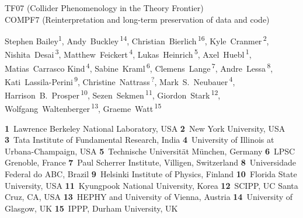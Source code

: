 \documentclass[11pt]{article}
\begin{document}
\pubblock

\snowmass{}


\begin{center}{\large
TF07 (Collider Phenomenology in the Theory Frontier)\\
COMPF7 (Reinterpretation and long-term preservation of data and code)}
\end{center}



\begin{center}
Stephen Bailey\textsuperscript{1},
Andy~Buckley\,\textsuperscript{14},
Christian~Bierlich\,\textsuperscript{16},
Kyle~Cranmer\,\textsuperscript{2},
Nishita~Desai\,\textsuperscript{3},
Matthew~Feickert\,\textsuperscript{4},
Lukas~Heinrich\,\textsuperscript{5},
Axel~Huebl\,\textsuperscript{1},
Matias~Carrasco Kind\,\textsuperscript{4},
Sabine~Kraml\,\textsuperscript{6},
Clemens~Lange\,\textsuperscript{7},
Andre~Lessa\,\textsuperscript{8},
Kati~Lassila-Perini\,\textsuperscript{9},
Christine~Nattrass\,\textsuperscript{?},
Mark~S.~Neubauer\,\textsuperscript{4},
Harrison~B.~Prosper\,\textsuperscript{10},
Sezen~Sekmen\,\textsuperscript{11},
Giordon~Stark\,\textsuperscript{12},
Wolfgang~Waltenberger\,\textsuperscript{13},
Graeme~Watt\,\textsuperscript{15}
\end{center}

\begin{center}
\textbf{1}~Lawrence Berkeley National Laboratory, USA
\textbf{2}~New York University, USA
\textbf{3}~Tata Institute of Fundamental Research, India
\textbf{4}~University of Illinois at Urbana-Champaign, USA
\textbf{5}~Technische Universität München, Germany
\textbf{6}~LPSC Grenoble, France
\textbf{7}~Paul Scherrer Institute, Villigen, Switzerland
\textbf{8}~Universidade Federal do ABC, Brazil
\textbf{9}~Helsinki Institute of Physics, Finland
\textbf{10}~Florida State University, USA
\textbf{11}~Kyungpook National University, Korea
\textbf{12}~SCIPP, UC Santa Cruz, CA, USA
\textbf{13}~HEPHY and University of Vienna, Austria
\textbf{14}~University of Glasgow, UK
\textbf{15}~IPPP, Durham University, UK
\end{center}
\end{document}
